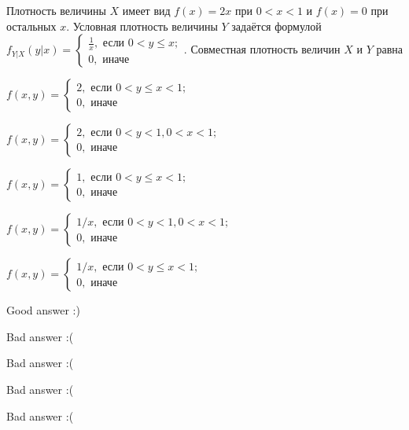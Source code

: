 
\begin{question}
Плотность величины \(X\) имеет вид \(f(x)=2x\) при \(0<x<1\) и
\(f(x)=0\) при остальных \(x\). Условная плотность величины \(Y\)
задаётся формулой
\(f_{Y|X}(y|x)=\begin{cases} \frac{1}{x}, \text{ если } 0<y\le x; \\ 0, \text{ иначе } \end{cases}.\)
Совместная плотность величин \(X\) и \(Y\) равна
\begin{answerlist}
  \item \(f(x,y)=\begin{cases} 2, \text{ если } 0<y\le x<1; \\ 0, \text{ иначе} \end{cases}\)
  \item \(f(x,y)=\begin{cases} 2, \text{ если } 0<y<1, 0 < x<1; \\ 0, \text{ иначе} \end{cases}\)
  \item \(f(x,y)=\begin{cases} 1, \text{ если } 0<y\le x<1; \\ 0, \text{ иначе} \end{cases}\)
  \item \(f(x,y)=\begin{cases} 1/x, \text{ если } 0<y<1, 0 < x<1; \\ 0, \text{ иначе} \end{cases}\)
  \item \(f(x,y)=\begin{cases} 1/x, \text{ если } 0<y\le x<1; \\ 0, \text{ иначе} \end{cases}\)
\end{answerlist}
\end{question}

\begin{solution}
\begin{answerlist}
  \item Good answer :)
  \item Bad answer :(
  \item Bad answer :(
  \item Bad answer :(
  \item Bad answer :(
\end{answerlist}
\end{solution}

